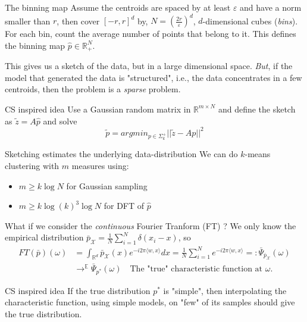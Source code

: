 \begin{frame}
	\begin{block}{The binning map}
		Assume the centroids are spaced by at least $\varepsilon$ and have a norm smaller than $r$, then cover $[-r,r]^d$ by, $N=(\frac{2r}{\varepsilon})^d$, $d$-dimensional cubes (\emph{bins}). For each bin, count the average number of points that belong to it. This defines the binning map $\hat{p}\in\mathbb{R}^N_+$.
	\end{block}
	This gives us a sketch of the data, but in a large dimensional space.\newline
	\emph{But}, if the model that generated the data is "structured", i.e., the data concentrates in a few centroids, then the problem is a \emph{sparse} problem.
	\begin{block}{CS inspired idea}
		Use a Gaussian random matrix in $\mathbb{R}^{m\times N}$ and define the sketch as $\tilde z = A\hat{p}$ and solve
		\begin{equation*}
			\tilde p = argmin_{p\in\Sigma_k^+}||\tilde z - Ap||^2 
		\end{equation*}
	\end{block}
\end{frame}

\begin{frame}{Sketching estimates the underlying data-distribution}
	We can do $k$-means clustering with $m$ measures using:
		\begin{itemize}
			\item $m\geq k\log N$ for Gaussian sampling
			\item $m \geq k\log(k)^3\log N$ for DFT of $\hat{p}$
		\end{itemize}
	What if we consider the \emph{continuous} Fourier Tranform (FT) ?
	\newline
	We only know the empirical distribution $\bar p_\mathcal{X} = \frac{1}{N}\sum_{i=1}^N \delta(x_i - x)$, so
	\begin{align*}
		FT(\bar p)(\omega) &= \int_{\mathbb{R}^d} \bar p_\mathcal{X}(x) e^{-i2\pi\langle w, x\rangle}dx = \frac{1}{N}\sum_{i=1}^N e^{-i2\pi\langle w,x\rangle} =: \bar \Psi_{\bar p_\mathcal{X}}(\omega) \\
				&\longrightarrow^{\mathbb{E}} \bar \Psi_{p^*}(\omega) \quad\text{The "true" characteristic function at $\omega$}.
	\end{align*}
	\begin{block}{CS inspired idea}
		If the true distribution $p^*$ is "simple", then interpolating the characteristic function, using simple models, on "few" of its samples should give the true distribution.
	\end{block}
\end{frame}

